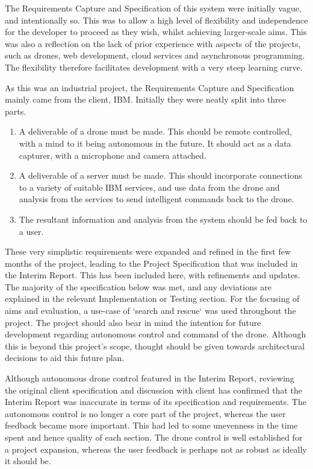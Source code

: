 \documentclass{article}
\begin{document}
The Requirements Capture and Specification of this system were initially vague, and intentionally so. This was to allow a high level of flexibility and independence for the developer to proceed as they wish, whilst achieving larger-scale aims. This was also a reflection on the lack of prior experience with aspects of the projects, such as drones, web development, cloud services and asynchronous programming. The flexibility therefore facilitates development with a very steep learning curve.

As this was an industrial project, the Requirements Capture and Specification mainly came from the client, IBM. Initially they were neatly split into three parts.

\begin{enumerate}
\item A deliverable of a drone must be made. This should be remote controlled, with a mind to it being autonomous in the future. It should act as a data capturer, with a microphone and camera attached.
\item A deliverable of a server must be made. This should incorporate connections to a variety of suitable IBM services, and use data from the drone and analysis from the services to send intelligent commands back to the drone.
\item The resultant information and analysis from the system should be fed back to a user. 
\end{enumerate}

These very simplistic requirements were expanded and refined in the first few months of the project, leading to the Project Specification that was included in the Interim Report. This has been included here, with refinements and updates. The majority of the specification below was met, and any deviations are explained in the relevant Implementation or Testing section. For the focusing of aims and evaluation, a use-case of `search and rescue` was used throughout the project. The project should also bear in mind the intention for future development regarding autonomous control and command of the drone. Although this is beyond this project's scope, thought should be given towards architectural decisions to aid this future plan. 

Although autonomous drone control featured in the Interim Report, reviewing the original client specification and discussion with client has confirmed that the Interim Report was inaccurate in terms of its specification and requirements. The autonomous control is no longer a core part of the project, whereas the user feedback became more important. This had led to some unevenness in the time spent and hence quality of each section. The drone control is well established for a project expansion, whereas the user feedback is perhaps not as robust as ideally it should be. 
\end{document}

